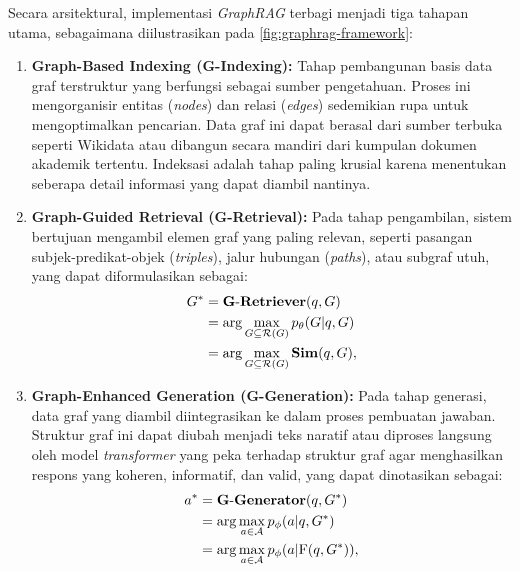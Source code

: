 Secara arsitektural, implementasi \textit{GraphRAG} terbagi menjadi tiga tahapan utama, sebagaimana diilustrasikan pada \ref{fig:graphrag-framework}:

\begin{enumerate}[label=\textbf{\Alph*.}, leftmargin=0.75cm]
    \item \textbf{Graph-Based Indexing (G-Indexing):} Tahap pembangunan basis data graf terstruktur yang berfungsi sebagai sumber pengetahuan. Proses ini mengorganisir entitas (\textit{nodes}) dan relasi (\textit{edges}) sedemikian rupa untuk mengoptimalkan pencarian. Data graf ini dapat berasal dari sumber terbuka seperti Wikidata \citep{wikidata} atau dibangun secara mandiri dari kumpulan dokumen akademik tertentu. Indeksasi adalah tahap paling krusial karena menentukan seberapa detail informasi yang dapat diambil nantinya.

    \item \textbf{Graph-Guided Retrieval (G-Retrieval):} Pada tahap pengambilan, sistem bertujuan mengambil elemen graf yang paling relevan, seperti pasangan subjek-predikat-objek (\textit{triples}), jalur hubungan (\textit{paths}), atau subgraf utuh, yang dapat diformulasikan sebagai:
          \begin{align}
              G^{*} & = \mathbf{G\text{-}Retriever}(q, G) \notag                                        \\
                    & = \arg\max_{G \subseteq \mathcal{R}(G)} p_{\theta}(G|q, G) \notag                 \\
                    & = \arg\max_{G \subseteq \mathcal{R}(G)} \mathbf{Sim}(q,G), \label{eq:g-retrieval}
          \end{align}

    \item \textbf{Graph-Enhanced Generation (G-Generation):} Pada tahap generasi, data graf yang diambil diintegrasikan ke dalam proses pembuatan jawaban. Struktur graf ini dapat diubah menjadi teks naratif atau diproses langsung oleh model \textit{transformer} yang peka terhadap struktur graf agar menghasilkan respons yang koheren, informatif, dan valid, yang dapat dinotasikan sebagai:
          \begin{align}
              a^{*} & = \mathbf{G\text{-}Generator}(q,G^{*}) \notag                                         \\
                    & = \arg\max_{a \in \mathcal{A}} p_{\phi}(a|q,G^{*}) \notag                             \\
                    & = \arg\max_{a \in \mathcal{A}} p_{\phi}(a|\text{F}(q,G^{*})), \label{eq:g-generation}
          \end{align}
\end{enumerate}



